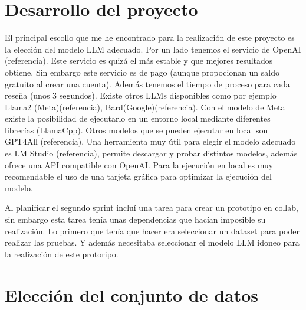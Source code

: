 \section{Desarrollo del proyecto}

El principal escollo que me he encontrado para la realización de este proyecto es la elección del modelo
LLM adecuado. Por un lado tenemos el servicio de OpenAI (referencia). Este servicio es quizá el más estable y que 
mejores resultados obtiene. Sin embargo este servicio es de pago (aunque propocionan un saldo gratuito al crear una cuenta).
Además tenemos el tiempo de proceso para cada reseña (unos 3 segundos).
Existe otros LLMs disponibles como por ejemplo Llama2 (Meta)(referencia), Bard(Google)(referencia).
Con el modelo de Meta existe la posibilidad de ejecutarlo en un entorno local mediante diferentes librerías (LlamaCpp).
Otros modelos que se pueden ejecutar en local son GPT4All (referencia).
Una herramienta muy útil para elegir el modelo adecuado es LM Studio (referencia), permite descargar y probar distintos modelos,
además ofrece una API compatible con OpenAI. 
Para la ejecución en local es muy recomendable el uso de una tarjeta gráfica para optimizar la ejecución del modelo.

Al planificar el segundo sprint incluí una tarea para crear un prototipo en collab, 
sin embargo esta tarea tenía unas dependencias que hacían imposible su realización.
Lo primero que tenía que hacer era seleccionar un dataset para poder realizar las pruebas.
Y además necesitaba seleccionar el modelo LLM idoneo para la realización de este protoripo.

\section{Elección del conjunto de datos}

